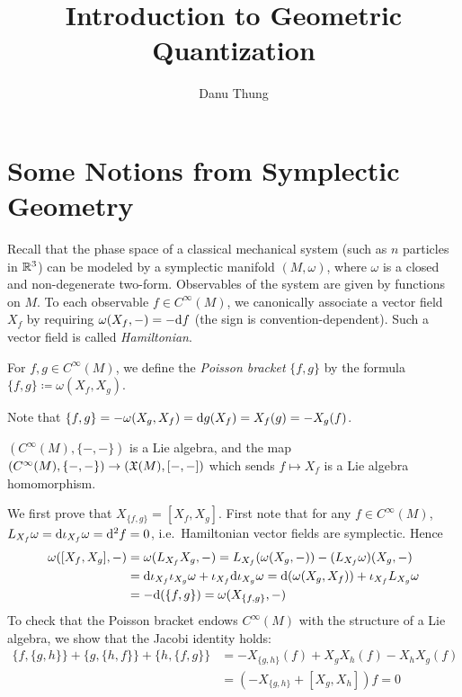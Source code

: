 \documentclass[parskip=half]{scrartcl}
\title{Introduction to Geometric Quantization}
\author{Danu Thung}
\date{}
\begin{document}
\maketitle

\section{Some Notions from Symplectic Geometry}

Recall that the phase space of a classical mechanical system (such as $n$ particles in $\mathbb{R}^3$) can be modeled by a symplectic manifold $(M,\omega)$, where $\omega$ is a closed and non-degenerate two-form. Observables of the system are given by functions on $M$. To each observable $f\in C^\infty(M)$, we canonically associate a vector field $X_f$ by requiring $\omega(X_f,-)=-\mathrm{d} f$ (the sign is convention-dependent). Such a vector field is called \emph{Hamiltonian}.

\begin{mydef}
	For $f,g\in C^\infty(M)$, we define the \emph{Poisson bracket} $\{f,g\}$ by the formula $\{f,g\}\coloneqq\omega(X_f,X_g)$.
\end{mydef}

\begin{rem}
	Note that $\{f,g\}=-\omega(X_g,X_f)=\mathrm{d} g(X_f)=X_f(g)=-X_g(f)$.
\end{rem}

\begin{lem}
	$(C^\infty(M),\{-,-\})$ is a Lie algebra, and the map $(C^\infty(M),\{-,-\})\to (\mathfrak{X}(M),[-,-])$ which sends $f\mapsto X_f$ is a Lie algebra homomorphism.
\end{lem}
\begin{myproof}
	We first prove that $X_{\{f,g\}}=[X_f,X_g]$. First note that for any $f\in C^\infty(M)$, $L_{X_f}\omega=\mathrm{d} \iota_{X_f}\omega=\mathrm{d}^2f=0$, i.e.~Hamiltonian vector fields are symplectic. Hence 
	\begin{align*}
		\omega([X_f,X_g],-)&=\omega(L_{X_f}X_g,-)=L_{X_f}(\omega(X_g,-))-(L_{X_f}\omega)(X_g,-)\\
		&=\mathrm{d}\iota_{X_f}\iota_{X_g}\omega+\iota_{X_f}\mathrm{d} \iota_{X_g}\omega=\mathrm{d}(\omega(X_g,X_f))+\iota_{X_f}L_{X_g}\omega\\
		&=-\mathrm{d}(\{f,g\})=\omega(X_{\{f,g\}},-)
	\end{align*}
	To check that the Poisson bracket endows $C^\infty(M)$ with the structure of a Lie algebra, we show that the Jacobi identity holds:
	\begin{align*}
		\{f,\{g,h\}\}+\{g,\{h,f\}\}+\{h,\{f,g\}\}
		&=-X_{\{g,h\}}(f)+X_gX_h(f) - X_h X_g(f)\\
		&=(-X_{\{g,h\}}+[X_g,X_h])f=0
	\end{align*}
\end{myproof}
\end{document}
